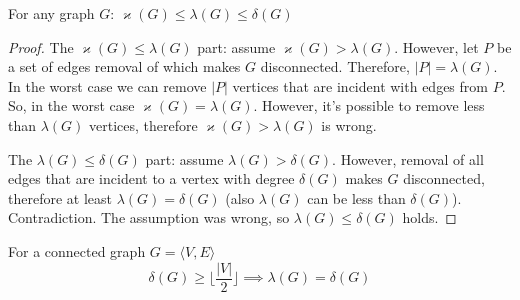 \documentclass[12pt, a4paper]{article}
\begin{document}
\begin{theorem}[Whitney]
For any graph \(G\): \(\varkappa(G) \le \lambda(G) \le \delta(G)\)
\end{theorem}

\begin{proof}
The \(\varkappa(G) \le \lambda(G)\) part:
assume \(\varkappa(G) > \lambda(G)\).
However, let \(P\) be a set of edges removal of which makes \(G\) disconnected.
Therefore, \(|P| = \lambda(G)\).
In the worst case we can remove \(|P|\) vertices that are incident with edges
from \(P\). So, in the worst case \(\varkappa(G) = \lambda(G)\).
However, it's possible to remove less than \(\lambda(G)\) vertices, therefore
\(\varkappa(G) > \lambda(G)\) is wrong.

The \(\lambda(G) \le \delta(G)\) part:
assume \(\lambda(G) > \delta(G)\).
However, removal of all edges that are incident to a vertex with degree
\(\delta(G)\) makes \(G\) disconnected,
therefore at least \(\lambda(G) = \delta(G)\)
(also \(\lambda(G)\) can be less than \(\delta(G)\)).
Contradiction. The assumption was wrong, so \(\lambda(G) \le \delta(G)\) holds.
\end{proof}

\begin{theorem}[Chartrand]
For a connected graph \(G = \langle V, E \rangle\)
\[\delta(G) \ge \lfloor \frac{|V|}{2} \rfloor \implies \lambda(G) = \delta(G)\]
\end{theorem}
\end{document}
